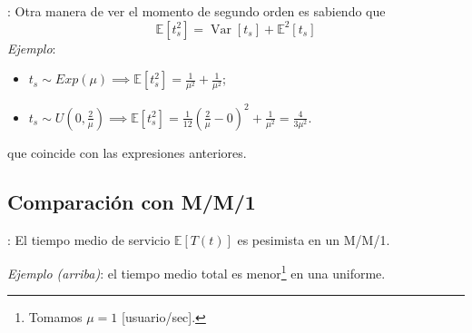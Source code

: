 \documentclass[xcolor={x11names}]{beamer}
\DeclareMathOperator{\Var}{Var}
\begin{document}
\begin{frame}{\secname: \subsecname}
    Otra manera de ver el momento de
    segundo orden es sabiendo que
    \begin{equation*}
        \mathbb{E}[t_s^2]=\Var[t_s]+
        \mathbb{E}^2[t_s]
    \end{equation*}
    \vfill
    \textit{Ejemplo}:
    \begin{itemize}
        \item $t_s\sim Exp(\mu)\implies
            \mathbb{E}[t_s^2]=\frac{1}{\mu^2}+
            \frac{1}{\mu^2}$;
        \item $t_s\sim U\left(0,\tfrac{2}{\mu}
            \right)
            \implies
            \mathbb{E}[t_s^2]=\frac{1}{12}
            \left(\frac{2}{\mu}-0\right)^2+
            \frac{1}{\mu^2}
            =\frac{4}{3\mu^2}$.
    \end{itemize}
    que coincide con las expresiones anteriores.
\end{frame}


\subsection{Comparación con M/M/1}
\begin{frame}{\secname: \subsecname}
    El tiempo medio de servicio
    $\mathbb{E}[T(t)]$
    es pesimista en un M/M/1.

    \vfill


    \begin{figure}
        
    \end{figure}
    \textit{Ejemplo (arriba)}: el tiempo medio
    total es menor\footnote{
        Tomamos $\mu=1$
    [usuario/sec].} en una
    uniforme.


\end{frame}






\end{document}
